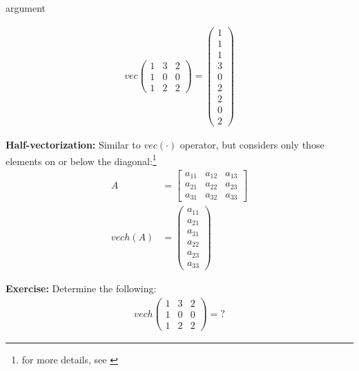 \begin{labeling}{argument}
    \begin{sol}
        \begin{align*}
            vec \begin{pmatrix}
                    1 & 3 & 2 \\
                    1 & 0 & 0 \\
                    1 & 2 & 2
                \end{pmatrix}
            =
            \begin{pmatrix}
                1 \\ 1 \\ 1 \\ 3 \\ 0 \\ 2 \\ 2 \\ 0 \\ 2
            \end{pmatrix}
        \end{align*}
    \end{sol}

    \item[\textbf{Half-vectorization:}] Similar to $vec(\cdot)$ operator, but considers only those elements on or below the diagonal:\footnote{for more details, see \cite[][page 300-301]{Hamilton-1994}}
    \begin{align*}
        A
         & = \begin{bmatrix}
                 a_{11} & a_{12} & a_{13} \\
                 a_{21} & a_{22} & a_{23} \\
                 a_{31} & a_{32} & a_{33}
             \end{bmatrix}
        \\
        vech(A)
         & = \begin{pmatrix}
                 a_{11} \\ a_{21} \\ a_{31} \\ a_{22} \\ a_{23} \\ a_{33}
             \end{pmatrix}
    \end{align*}

    \textbf{Exercise:} Determine the following:
    \begin{align*}
        vech \begin{pmatrix}
                 1 & 3 & 2 \\
                 1 & 0 & 0 \\
                 1 & 2 & 2
             \end{pmatrix}
        =
        ?
    \end{align*}


\end{labeling}
